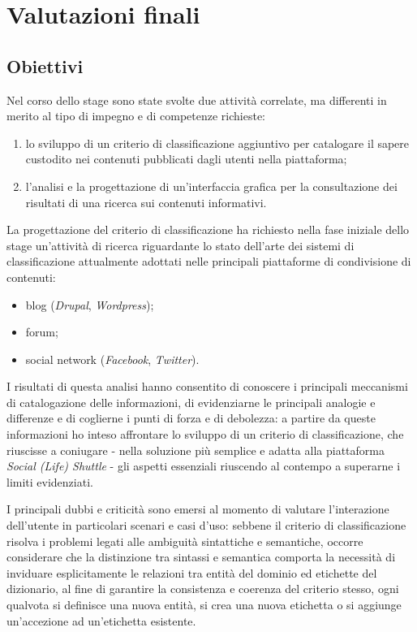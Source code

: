 \chapter{Valutazioni finali}
\label{ch:tesi:valutazioni}

\section{Obiettivi}
Nel corso dello stage sono state svolte due attività correlate, ma differenti in merito al tipo di impegno e di competenze richieste:
\begin{enumerate}
  \item lo sviluppo di un criterio di classificazione aggiuntivo per catalogare il sapere custodito nei contenuti pubblicati dagli utenti nella piattaforma;
  \item l'analisi e la progettazione di un'interfaccia grafica per la consultazione dei risultati di una ricerca sui contenuti informativi.
\end{enumerate}

La progettazione del criterio di classificazione ha richiesto nella fase iniziale dello stage un'attività di ricerca riguardante lo stato dell'arte dei sistemi di classificazione attualmente adottati nelle principali piattaforme di condivisione di contenuti:
\begin{itemize}
  \item blog (\textit{Drupal}, \textit{Wordpress});
  \item forum;
  \item social network (\textit{Facebook}, \textit{Twitter}).
\end{itemize}

I risultati di questa analisi hanno consentito di conoscere i principali meccanismi di catalogazione delle informazioni, di evidenziarne le principali analogie e differenze e di coglierne i punti di forza e di debolezza: a partire da queste informazioni ho inteso affrontare lo sviluppo di un criterio di classificazione, che riuscisse a coniugare - nella soluzione più semplice e adatta alla piattaforma \textit{Social (Life) Shuttle} - gli aspetti essenziali riuscendo al contempo a superarne i limiti evidenziati.

I principali dubbi e criticità sono emersi al momento di valutare l'interazione dell'utente in particolari scenari e casi d'uso: sebbene il criterio di classificazione risolva i problemi legati alle ambiguità sintattiche e semantiche, occorre considerare che la distinzione tra sintassi e semantica comporta la necessità di inviduare esplicitamente le relazioni tra entità del dominio ed etichette del dizionario, al fine di garantire la consistenza e coerenza del criterio stesso, ogni qualvota si definisce una nuova entità, si crea una nuova etichetta o si aggiunge un'accezione ad un'etichetta esistente.

